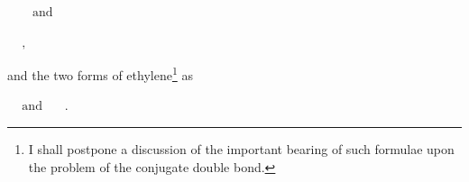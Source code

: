 \documentclass[11pt]{memoir}
\begin{document}



\bigskip
\begin{center}
 $\;\;$
$\;\;\; \;\textrm{and} \;\;$ 

\bigskip
{} $\;$
$\;\;,$
\end{center}
\bigskip
and the two forms of ethylene\footnote{I shall postpone a discussion of the important bearing of such formulae upon the problem of the conjugate double bond.} as %

\renewcommand*\printatom[1]{\ensuremath{\mathbf{#1}}}




\bigskip

\begin{center}
 $\;\;$
$\;\mathrm{and} \;\;$
\bigskip
	 $\;$
	$\; .$
\end{center}
\bigskip
\end{document}
